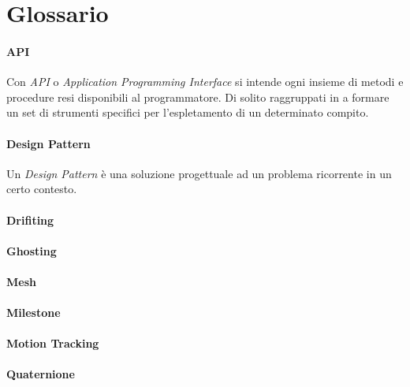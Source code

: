 
\chapter{Glossario}\label{appendix:Glossario}

\subsubsection{API}
Con \emph{API} o \emph{Application Programming Interface} si intende ogni insieme di metodi e procedure resi disponibili al programmatore. Di solito raggruppati in a formare un set di strumenti specifici per l'espletamento di un determinato compito.

\subsubsection{Design Pattern}
Un \emph{Design Pattern} è una soluzione progettuale ad un problema ricorrente in un certo contesto.

\subsubsection{Drifiting}


\subsubsection{Ghosting}

\subsubsection{Mesh}

\subsubsection{Milestone}

\subsubsection{Motion Tracking}

\subsubsection{Quaternione}

